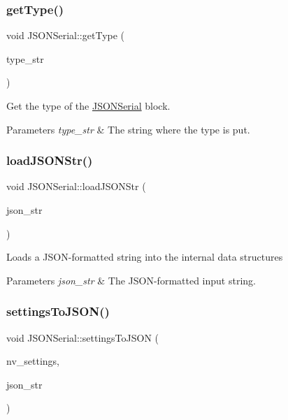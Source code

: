 \subsubsection{\texorpdfstring{get\+Type()}{getType()}}
{\footnotesize\ttfamily void J\+S\+O\+N\+Serial\+::get\+Type (\begin{DoxyParamCaption}\item[{string \&}]{type\+\_\+str }\end{DoxyParamCaption})}

Get the type of the \hyperlink{classJSONSerial}{J\+S\+O\+N\+Serial} block. 
\begin{DoxyParams}{Parameters}
{\em type\+\_\+str} & The string where the type is put. \\
\hline
\end{DoxyParams}
\mbox{\label{classJSONSerial_a21379660c361f4d26f0fd42a4734662e}} 
\subsubsection{\texorpdfstring{load\+J\+S\+O\+N\+Str()}{loadJSONStr()}}
{\footnotesize\ttfamily void J\+S\+O\+N\+Serial\+::load\+J\+S\+O\+N\+Str (\begin{DoxyParamCaption}\item[{string \&}]{json\+\_\+str }\end{DoxyParamCaption})}

Loads a J\+S\+O\+N-\/formatted string into the internal data structures 
\begin{DoxyParams}{Parameters}
{\em json\+\_\+str} & The J\+S\+O\+N-\/formatted input string. \\
\hline
\end{DoxyParams}
\mbox{\label{classJSONSerial_a32f2b8eddfbe137c61b77352445e1e09}} 
\subsubsection{\texorpdfstring{settings\+To\+J\+S\+O\+N()}{settingsToJSON()}}
{\footnotesize\ttfamily void J\+S\+O\+N\+Serial\+::settings\+To\+J\+S\+ON (\begin{DoxyParamCaption}\item[{Mbed\+J\+S\+O\+N\+Value \&}]{nv\+\_\+settings,  }\item[{string \&}]{json\+\_\+str }\end{DoxyParamCaption})}

